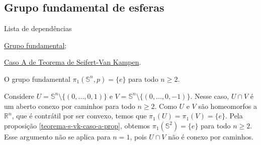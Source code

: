 \subsection{Grupo fundamental de esferas} %
\label{grupo-fundamental-de-esferas-prop}
\begin{titlemize}{Lista de dependências}
	\item \hyperref[grupo-fundamental]{Grupo fundamental};\\
    \item \hyperref[teorema-s-vk-caso-a-prop]{Caso A de Teorema de Seifert-Van Kampen}.
\end{titlemize}

\begin{corol}
    O grupo fundamental $\pi_1(\mathbb{S}^n,p)=\{e\}$ para todo $n\ge 2$.
\end{corol}
\begin{dem}
    Considere $U=\mathbb{S}^n\setminus\{(0,...,0,1)\}$ e $V=\mathbb{S}^n\setminus\{(0,...,0,-1)\}$. Nesse caso, $U\cap V$ é um aberto conexo por caminhos para todo $n\ge 2$. Como $U$ e $V$ são homeomorfos a $\mathbb{R}^n$, que é contrátil por ser convexo, temos que $\pi_1(U)=\pi_1(V)=\{e\}$. Pela proposição \ref{teorema-s-vk-caso-a-prop}, obtemos $\pi_1(\mathbb{S}^2)=\{e\}$ para todo $n\ge 2$. Esse argumento não se aplica para $n=1$, pois $U\cap V$ não é conexo por caminhos. 
\end{dem}